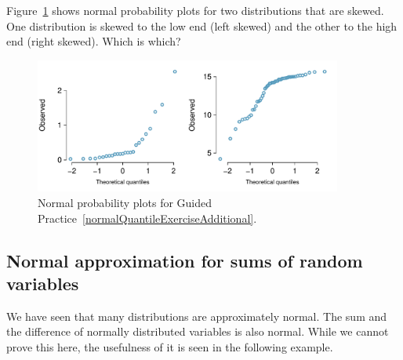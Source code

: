 \begin{exercisewrap}
\begin{nexercise} \label{normalQuantileExerciseAdditional}
Figure~\ref{normalQuantileExerAdditional} shows normal probability plots for two distributions that are skewed. One distribution is skewed to the low end (left skewed) and the other to the high end (right skewed). Which is which?\footnotemark
\end{nexercise}
\end{exercisewrap}


\begin{figure}
\centering
\includegraphics[width=0.9\textwidth]{ch_distributions/figures/normalQuantileExer/normalQuantileExerAdditional}
\caption{Normal probability plots for Guided Practice~\ref{normalQuantileExerciseAdditional}.}
\label{normalQuantileExerAdditional}
\end{figure}



\subsection{Normal approximation for sums of random variables}
\label{normapproxsumrv}

We have seen that many distributions are approximately normal. The sum and the difference of normally distributed variables is also normal. While we cannot prove this here, the usefulness of it is seen in the following example.

